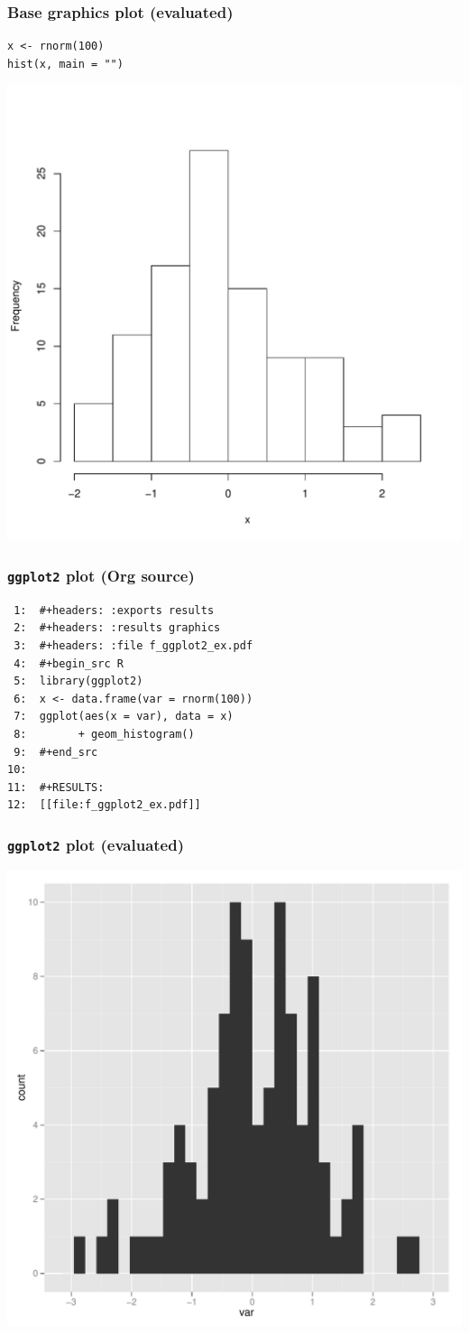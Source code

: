 \documentclass[bigger]{beamer}
\begin{document}
\begin{frame}[fragile]
\frametitle{Base graphics plot (evaluated)}
\label{sec-3-1-7}



\lstset{language=R}
\begin{lstlisting}
x <- rnorm(100)
hist(x, main = "")
\end{lstlisting}


\includegraphics[width = 0.6\linewidth]{../fig/f_baseplot.pdf}
\end{frame}
\begin{frame}[fragile]
\frametitle{\texttt{ggplot2} plot (Org source)}
\label{sec-3-1-8}



\begin{verbatim}
 1:  #+headers: :exports results 
 2:  #+headers: :results graphics
 3:  #+headers: :file f_ggplot2_ex.pdf
 4:  #+begin_src R 
 5:  library(ggplot2)
 6:  x <- data.frame(var = rnorm(100))
 7:  ggplot(aes(x = var), data = x) 
 8:        + geom_histogram()
 9:  #+end_src 
10:  
11:  #+RESULTS:
12:  [[file:f_ggplot2_ex.pdf]]
\end{verbatim}
\end{frame}
\begin{frame}
\frametitle{\texttt{ggplot2} plot (evaluated)}
\label{sec-3-1-9}


 

\includegraphics[width = 0.7\linewidth]{../fig/f_ggplot2_example.pdf}
\end{frame}
\end{document}
